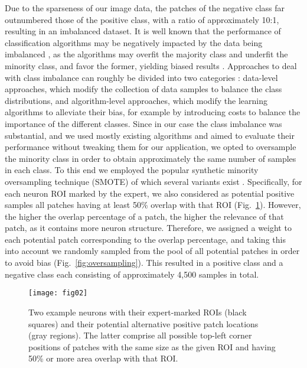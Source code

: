 Due to the sparseness of our image data, the patches of the negative class far outnumbered those of the positive class, with a ratio of approximately 10:1, resulting in an imbalanced dataset. It is well known that the performance of classification algorithms may be negatively impacted by the data being imbalanced \citep{Chawla:2004:ESI:1007730.1007733, Daskalaki06evaluationof, Forman:2010:ACS:1882471.1882479, Branco:2016:SPM:2966278.2907070}, as the algorithms may overfit the majority class and underfit the minority class, and favor the former, yielding biased results \citep{Garcia2014, Li20181}. Approaches to deal with class imbalance can roughly be divided into two categories \citep{5128907, Krawczyk-2016, Haixiang-2017}: data-level approaches, which modify the collection of data samples to balance the class distributions, and algorithm-level approaches, which modify the learning algorithms to alleviate their bias, for example by introducing costs to balance the importance of the different classes. Since in our case the class imbalance was substantial, and we used mostly existing algorithms and aimed to evaluate their performance without tweaking them for our application, we opted to oversample the minority class in order to obtain approximately the same number of samples in each class. {\color{red}To this end we employed the popular synthetic minority oversampling technique (SMOTE) \citep{Chawla:2002:SSM:1622407.1622416} of which several variants exist \citep{Saez2015, Krawczyk-2016, Gosain2017}.} Specifically, for each neuron ROI marked by the expert, we also considered as potential positive samples all patches having at least 50\% overlap with that ROI (Fig.~\ref{fig:neuronROI}). However, the higher the overlap percentage of a patch, the higher the relevance of that patch, as it contains more neuron structure. Therefore, we assigned a weight to each potential patch corresponding to the overlap percentage, and taking this into account we randomly sampled from the pool of all potential patches in order to avoid bias (Fig.~\ref{fig:oversampling}). This resulted in a positive class and a negative class each consisting of approximately 4,500 samples in total.

\begin{figure}[!t]
\centering
\texttt{[image: fig02]}
\caption{Two example neurons with their expert-marked ROIs (black squares) and their potential alternative positive patch locations (gray regions). The latter comprise all possible top-left corner positions of patches with the same size as the given ROI and having 50\% or more area overlap with that ROI.}
\label{fig:neuronROI}
\end{figure}

